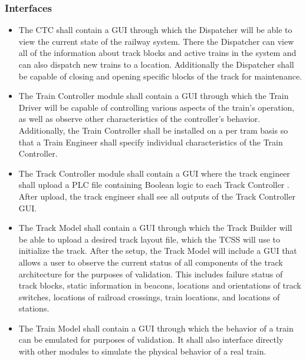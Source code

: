 \documentclass{article}
\begin{document}
    \subsubsection{Interfaces}
    \begin{itemize}
        \item The CTC  shall contain a GUI through which the Dispatcher  will be able to view the current state of the railway system.  There the Dispatcher  can view all of the information about track blocks and active trains in the system and can also dispatch new trains to a location.  Additionally the Dispatcher  shall be capable of closing and opening specific blocks of the track for maintenance. 
        
        \item The Train Controller  module shall contain a GUI through which the Train Driver will be capable of controlling various aspects of the train's operation, as well as observe other characteristics of the controller's behavior. Additionally, the Train Controller  shall be installed on a per tram basis so that a Train Engineer  shall specify individual characteristics of the Train Controller.
        
        \item The Track Controller  module shall contain a GUI where the track engineer shall upload a PLC  file containing Boolean logic to each Track Controller . After upload, the track engineer shall see all outputs of the Track Controller  GUI.
        
        \item The Track Model  shall contain a GUI through which the Track Builder  will be able to upload a desired track layout file, which the TCSS will use to initialize the track. After the setup, the Track Model  will include a GUI that allows a user to observe the current status of all components of the track architecture for the purposes of validation. This includes failure status of track blocks, static information in beacons, locations and orientations of track switches, locations of railroad crossings, train locations, and locations of stations.
        
        \item The Train Model shall contain a GUI through which the behavior of a train can be emulated for purposes of validation. It shall also interface  directly with other modules to simulate the physical behavior of a real train.
    \end{itemize}
\end{document}
